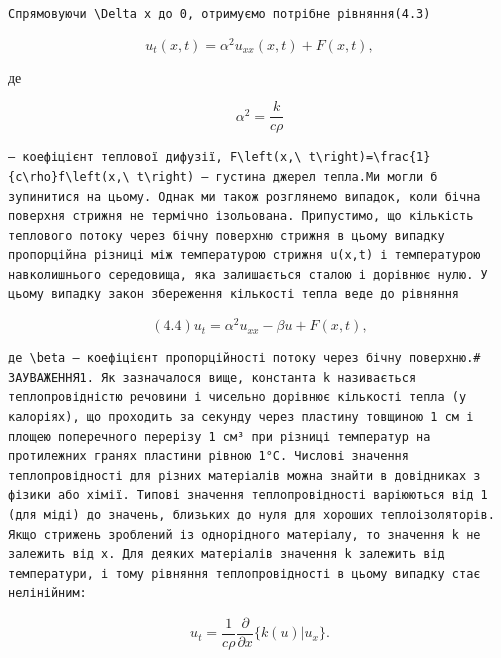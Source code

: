 \documentclass[
  ukrainian,
]{article}
\begin{document}
\begin{verbatim}
Спрямовуючи \Delta x до 0, отримуємо потрібне рівняння(4.3)
\end{verbatim}

\[
u_t(x, t) = \alpha^2 u_{xx}(x, t) + F(x, t),
\]

де

\[
\alpha^{2}=\frac{k}{c\rho}
\]

\begin{verbatim}
— коефіцієнт теплової дифузії, F\left(x,\ t\right)=\frac{1}{c\rho}f\left(x,\ t\right) — густина джерел тепла.Ми могли б зупинитися на цьому. Однак ми також розглянемо випадок, коли бічна поверхня стрижня не термічно ізольована. Припустимо, що кількість теплового потоку через бічну поверхню стрижня в цьому випадку пропорційна різниці між температурою стрижня u(x,t) і температурою навколишнього середовища, яка залишається сталою і дорівнює нулю. У цьому випадку закон збереження кількості тепла веде до рівняння
\end{verbatim}

\[
(4.4) u_t = \alpha^2 u_{xx} - \beta u + F(x, t),
\]

\begin{verbatim}
де \beta — коефіцієнт пропорційності потоку через бічну поверхню.# ЗАУВАЖЕННЯ1. Як зазначалося вище, константа k називається теплопровідністю речовини і чисельно дорівнює кількості тепла (у калоріях), що проходить за секунду через пластину товщиною 1 см і площею поперечного перерізу 1 см³ при різниці температур на протилежних гранях пластини рівною 1°C. Числові значення теплопровідності для різних матеріалів можна знайти в довідниках з фізики або хімії. Типові значення теплопровідності варіюються від 1 (для міді) до значень, близьких до нуля для хороших теплоізоляторів. Якщо стрижень зроблений із однорідного матеріалу, то значення k не залежить від x. Для деяких матеріалів значення k залежить від температури, і тому рівняння теплопровідності в цьому випадку стає нелінійним:
\end{verbatim}

\[
u_{t} = \frac{1}{c\rho} \frac{\partial}{\partial x} \{ k (u) | u_{x} \}.
\]
\end{document}
